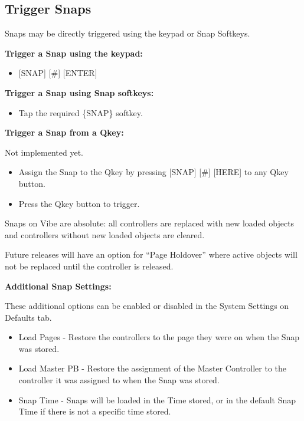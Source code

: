 \documentclass[
]{article}
\providecommand{\tightlist}{%
  \setlength{\itemsep}{0pt}\setlength{\parskip}{0pt}}
\begin{document}
\hypertarget{Trigger-Snaps-12.2}{%
\subsection{Trigger Snaps}\label{Trigger-Snaps-12.2}}

Snaps may be directly triggered using the keypad or Snap Softkeys.

\textbf{Trigger a Snap using the keypad:}

\begin{itemize}
\tightlist
\item
  {[}SNAP{]} {[}\#{]} {[}ENTER{]}
\end{itemize}

\textbf{Trigger a Snap using Snap softkeys:}

\begin{itemize}
\tightlist
\item
  Tap the required \{SNAP\} softkey.
\end{itemize}

\textbf{Trigger a Snap from a Qkey:}

{Not implemented yet.}

\begin{itemize}
\item
  {Assign the Snap to the Qkey by pressing {[}SNAP{]} {[}\#{]} {[}HERE{]} to any Qkey button.}
\item
  {Press the Qkey button to trigger.}
\end{itemize}

Snaps on Vibe are absolute: all controllers are replaced with new loaded objects and controllers without new loaded objects are cleared.

{Future releases will have an option for ``Page Holdover'' where active objects will not be replaced until the controller is released.}

\textbf{Additional Snap Settings:}

These additional options can be enabled or disabled in the System Settings on Defaults tab.

\begin{itemize}
\item
  Load Pages - Restore the controllers to the page they were on when the Snap was stored.
\item
  Load Master PB - Restore the assignment of the Master Controller to the controller it was assigned to when the Snap was stored.
\item
  Snap Time - Snaps will be loaded in the Time stored, or in the default Snap Time if there is not a specific time stored.
\end{itemize}
\end{document}
